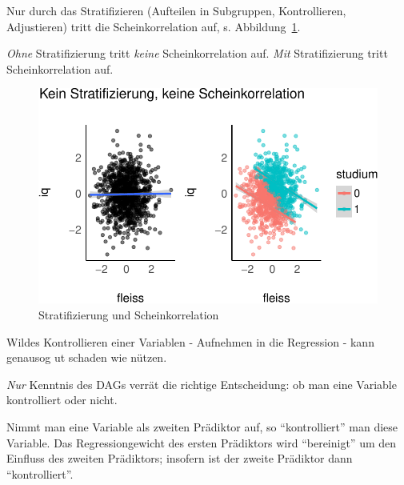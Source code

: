 \documentclass[
  a4paper,
  DIV=11]{scrreprt}
\theoremstyle{definition}
\theoremstyle{remark}
\begin{document}
Nur durch das Stratifizieren (Aufteilen in Subgruppen, Kontrollieren,
Adjustieren) tritt die Scheinkorrelation auf, s.
Abbildung~\ref{fig-eignung-strat}.

\begin{tcolorbox}[enhanced jigsaw, colframe=quarto-callout-note-color-frame, title=\textcolor{quarto-callout-note-color}{\faInfo}\hspace{0.5em}{Hinweis}, breakable, leftrule=.75mm, coltitle=black, toptitle=1mm, bottomrule=.15mm, bottomtitle=1mm, opacityback=0, arc=.35mm, rightrule=.15mm, left=2mm, colbacktitle=quarto-callout-note-color!10!white, opacitybacktitle=0.6, toprule=.15mm, titlerule=0mm, colback=white]
\emph{Ohne} Stratifizierung tritt \emph{keine} Scheinkorrelation auf.
\emph{Mit} Stratifizierung tritt Scheinkorrelation auf.
\end{tcolorbox}

\begin{figure}

{\centering \includegraphics{./kausal_files/figure-pdf/fig-eignung-strat-1.pdf}

}

\caption{\label{fig-eignung-strat}Stratifizierung und Scheinkorrelation}

\end{figure}

Wildes Kontrollieren einer Variablen - Aufnehmen in die Regression -
kann genausog ut schaden wie nützen.

\emph{Nur} Kenntnis des DAGs verrät die richtige Entscheidung: ob man
eine Variable kontrolliert oder nicht.

\begin{tcolorbox}[enhanced jigsaw, colframe=quarto-callout-note-color-frame, title=\textcolor{quarto-callout-note-color}{\faInfo}\hspace{0.5em}{Hinweis}, breakable, leftrule=.75mm, coltitle=black, toptitle=1mm, bottomrule=.15mm, bottomtitle=1mm, opacityback=0, arc=.35mm, rightrule=.15mm, left=2mm, colbacktitle=quarto-callout-note-color!10!white, opacitybacktitle=0.6, toprule=.15mm, titlerule=0mm, colback=white]
Nimmt man eine Variable als zweiten Prädiktor auf, so ``kontrolliert''
man diese Variable. Das Regressiongewicht des ersten Prädiktors wird
``bereinigt'' um den Einfluss des zweiten Prädiktors; insofern ist der
zweite Prädiktor dann ``kontrolliert''.
\end{tcolorbox}
\end{document}
